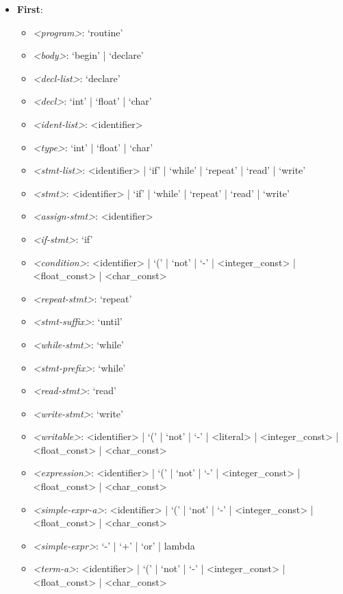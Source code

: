     \begin{itemize}
        \item \textbf{First}:
        \begin{itemize}
            \item \textit{<program>}: `routine'
            \item \textit{<body>}: `begin' | `declare'
            \item \textit{<decl-list>}: `declare'
            \item \textit{<decl>}: `int' | `float' | `char'
            \item \textit{<ident-list>}: <identifier>
            \item \textit{<type>}: `int' | `float' | `char'
            \item \textit{<stmt-list>}: <identifier> | `if' | `while' | `repeat' | `read' | `write'
            \item \textit{<stmt>}: <identifier> | `if' | `while' | `repeat' | `read' | `write'
            \item \textit{<assign-stmt>}: <identifier>
            \item \textit{<if-stmt>}: `if'
            \item \textit{<condition>}: <identifier> | `(' | `not' | `-' | <integer_const> | <float_const> | <char_const>
            \item \textit{<repeat-stmt>}: `repeat'
            \item \textit{<stmt-suffix>}: `until'
            \item \textit{<while-stmt>}: `while'
            \item \textit{<stmt-prefix>}: `while'
            \item \textit{<read-stmt>}: `read'
            \item \textit{<write-stmt>}: `write'
            \item \textit{<writable>}: <identifier> | `(' | `not' | `-' | <literal> | <integer_const> | <float_const> | <char_const>
            \item \textit{<expression>}: <identifier> | `(' | `not' | `-' | <integer_const> | <float_const> | <char_const>
            \item \textit{<simple-expr-a>}: <identifier> | `(' | `not' | `-' | <integer_const> | <float_const> | <char_const>
            \item \textit{<simple-expr>}: `-' | `+' | `or' | lambda
            \item \textit{<term-a>}: <identifier> | `(' | `not' | `-' | <integer_const> | <float_const> | <char_const>

\end{itemize}
\end{itemize}
